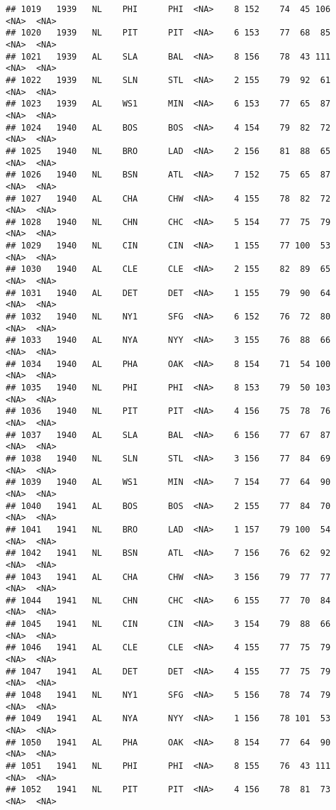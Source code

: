 \documentclass[]{article}
\begin{document}
\begin{verbatim}
## 1019   1939   NL    PHI      PHI  <NA>    8 152    74  45 106   <NA>  <NA>
## 1020   1939   NL    PIT      PIT  <NA>    6 153    77  68  85   <NA>  <NA>
## 1021   1939   AL    SLA      BAL  <NA>    8 156    78  43 111   <NA>  <NA>
## 1022   1939   NL    SLN      STL  <NA>    2 155    79  92  61   <NA>  <NA>
## 1023   1939   AL    WS1      MIN  <NA>    6 153    77  65  87   <NA>  <NA>
## 1024   1940   AL    BOS      BOS  <NA>    4 154    79  82  72   <NA>  <NA>
## 1025   1940   NL    BRO      LAD  <NA>    2 156    81  88  65   <NA>  <NA>
## 1026   1940   NL    BSN      ATL  <NA>    7 152    75  65  87   <NA>  <NA>
## 1027   1940   AL    CHA      CHW  <NA>    4 155    78  82  72   <NA>  <NA>
## 1028   1940   NL    CHN      CHC  <NA>    5 154    77  75  79   <NA>  <NA>
## 1029   1940   NL    CIN      CIN  <NA>    1 155    77 100  53   <NA>  <NA>
## 1030   1940   AL    CLE      CLE  <NA>    2 155    82  89  65   <NA>  <NA>
## 1031   1940   AL    DET      DET  <NA>    1 155    79  90  64   <NA>  <NA>
## 1032   1940   NL    NY1      SFG  <NA>    6 152    76  72  80   <NA>  <NA>
## 1033   1940   AL    NYA      NYY  <NA>    3 155    76  88  66   <NA>  <NA>
## 1034   1940   AL    PHA      OAK  <NA>    8 154    71  54 100   <NA>  <NA>
## 1035   1940   NL    PHI      PHI  <NA>    8 153    79  50 103   <NA>  <NA>
## 1036   1940   NL    PIT      PIT  <NA>    4 156    75  78  76   <NA>  <NA>
## 1037   1940   AL    SLA      BAL  <NA>    6 156    77  67  87   <NA>  <NA>
## 1038   1940   NL    SLN      STL  <NA>    3 156    77  84  69   <NA>  <NA>
## 1039   1940   AL    WS1      MIN  <NA>    7 154    77  64  90   <NA>  <NA>
## 1040   1941   AL    BOS      BOS  <NA>    2 155    77  84  70   <NA>  <NA>
## 1041   1941   NL    BRO      LAD  <NA>    1 157    79 100  54   <NA>  <NA>
## 1042   1941   NL    BSN      ATL  <NA>    7 156    76  62  92   <NA>  <NA>
## 1043   1941   AL    CHA      CHW  <NA>    3 156    79  77  77   <NA>  <NA>
## 1044   1941   NL    CHN      CHC  <NA>    6 155    77  70  84   <NA>  <NA>
## 1045   1941   NL    CIN      CIN  <NA>    3 154    79  88  66   <NA>  <NA>
## 1046   1941   AL    CLE      CLE  <NA>    4 155    77  75  79   <NA>  <NA>
## 1047   1941   AL    DET      DET  <NA>    4 155    77  75  79   <NA>  <NA>
## 1048   1941   NL    NY1      SFG  <NA>    5 156    78  74  79   <NA>  <NA>
## 1049   1941   AL    NYA      NYY  <NA>    1 156    78 101  53   <NA>  <NA>
## 1050   1941   AL    PHA      OAK  <NA>    8 154    77  64  90   <NA>  <NA>
## 1051   1941   NL    PHI      PHI  <NA>    8 155    76  43 111   <NA>  <NA>
## 1052   1941   NL    PIT      PIT  <NA>    4 156    78  81  73   <NA>  <NA>

\end{verbatim}
\end{document}
